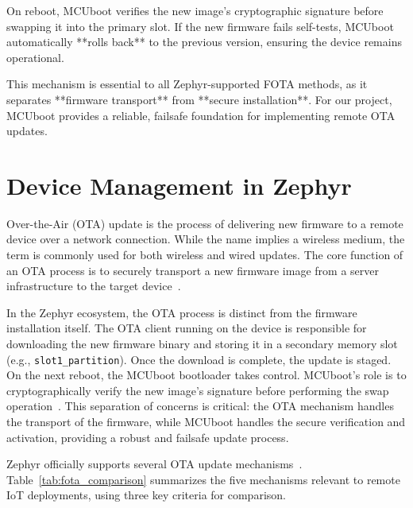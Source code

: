 On reboot, MCUboot verifies the new image’s cryptographic signature before swapping it into the primary slot. If the new firmware fails self-tests, MCUboot automatically **rolls back** to the previous version, ensuring the device remains operational.

This mechanism is essential to all Zephyr-supported FOTA methods, as it separates **firmware transport** from **secure installation**. For our project, MCUboot provides a reliable, failsafe foundation for implementing remote OTA updates.


\section{Device Management in Zephyr}

Over-the-Air (OTA) update is the process of delivering new firmware to a remote device over a network connection. While the name implies a wireless medium, the term is commonly used for both wireless and wired updates. The core function of an OTA process is to securely transport a new firmware image from a server infrastructure to the target device~\cite{zephyr_ota_updates}.

In the Zephyr ecosystem, the OTA process is distinct from the firmware installation itself. The OTA client running on the device is responsible for downloading the new firmware binary and storing it in a secondary memory slot (e.g., \texttt{slot1\_partition}). Once the download is complete, the update is staged. On the next reboot, the MCUboot bootloader takes control. MCUboot's role is to cryptographically verify the new image's signature before performing the swap operation~\cite{mcuboot_design}. This separation of concerns is critical: the OTA mechanism handles the transport of the firmware, while MCUboot handles the secure verification and activation, providing a robust and failsafe update process.

Zephyr officially supports several OTA update mechanisms~\cite{zephyr_fota_overview}. Table~\ref{tab:fota_comparison} summarizes the five mechanisms relevant to remote IoT deployments, using three key criteria for comparison.

